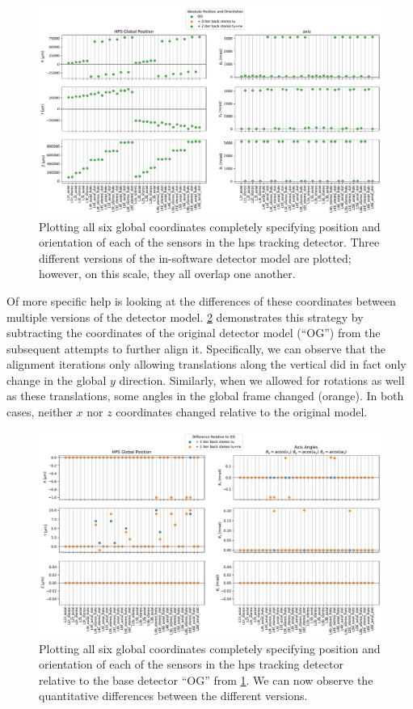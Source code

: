 \begin{figure}
	\centering
	\includegraphics[width=\textwidth]{figures/hps/alignment/example-det-vis-abs.pdf}
	\caption{Plotting all six global coordinates completely specifying position and orientation
	of each of the sensors in the \ac{hps} tracking detector. Three different versions of the
	in-software detector model are plotted; however, on this scale, they all overlap one another.}
	\label{fig:example-det-vis-abs}
\end{figure}

Of more specific help is looking at the differences of these coordinates between
multiple versions of the detector model. \cref{fig:example-det-vis-diff} demonstrates
this strategy by subtracting the coordinates of the original detector model (``OG'')
from the subsequent attempts to further align it. Specifically, we can observe that
the alignment iterations only allowing translations along the vertical did in fact
only change in the global $y$ direction. Similarly, when we allowed for rotations as
well as these translations, some angles in the global frame changed (orange).
In both cases, neither $x$ nor $z$ coordinates changed relative to the original model.

\begin{figure}
	\centering
	\includegraphics[width=\textwidth]{figures/hps/alignment/example-det-vis-diff.pdf}
	\caption{Plotting all six global coordinates completely specifying position and
	orientation of each of the sensors in the \ac{hps} tracking detector relative to
	the base detector ``OG'' from \cref{fig:example-det-vis-abs}. We can now observe
	the quantitative differences between the different versions.}
	\label{fig:example-det-vis-diff}
\end{figure}